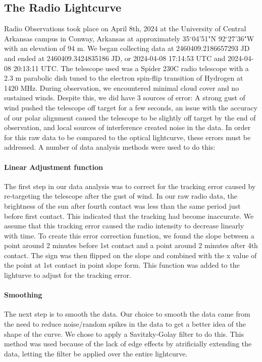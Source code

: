 \subsection{\label{sec:radio}The Radio Lightcurve}
Radio Observations took place on April 8th, 2024 at the University of Central Arkansas campus in Conway, Arkansas at approximately 35$^\circ$04'51"N 92$^\circ$27'36"W with an elevation of 94 m.
We began collecting data at 2460409.2186657293 JD and ended at 2460409.3424835186 JD, or 2024-04-08 17:14:53 UTC and 2024-04-08 20:13:11 UTC.
The telescope used was a Spider 230C radio telescope with a 2.3 m parabolic dish tuned to the electron spin-flip transition of Hydrogen at 1420 MHz.
During observation, we encountered minimal cloud cover and no sustained winds.
Despite this, we did have 3 sources of error: A strong gust of wind pushed the telescope off target for a few seconds, an issue with the accuracy of our polar alignment caused the telescope to be slightly off target by the end of observation, and local sources of interference created noise in the data.
In order for this raw data to be compared to the optical lightcurve, these errors must be addressed.
A number of data analysis methods were used to do this:
\paragraph{Linear Adjustment function}
The first step in our data analysis was to correct for the tracking error caused by re-targeting the telescope after the gust of wind.
In our raw radio data, the brightness of the sun after fourth contact was less than the same period just before first contact.
This indicated that the tracking had become inaccurate.
We assume that this tracking error caused the radio intensity to decrease linearly with time.
To create this error correction function, we found the slope between a point around 2 minutes before 1st contact and a point around 2 minutes after 4th contact. 
The sign was then flipped on the slope and combined with the x value of the point at 1st contact in point slope form.
This function was added to the lighturve to adjust for the tracking error.
\paragraph{Smoothing}
The next step is to smooth the data.
Our choice to smooth the data came from the need to reduce noise/random spikes in the data to get a better idea of the shape of the curve.
We chose to apply a Savitzky-Golay filter \cite{savitzky_golay_1964} to do this. 
This method was used because of the lack of edge effects by atrificially extending the data, letting the filter be applied over the entire lightcurve.
